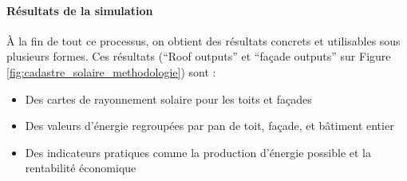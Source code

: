 \paragraph{Résultats de la simulation}
\par{À la fin de tout ce processus, on obtient des résultats concrets et utilisables sous plusieurs formes. Ces résultats (``Roof outputs'' et ``façade outputs'' sur Figure \ref{fig:cadastre_solaire_methodologie}) sont :
\begin{itemize}
    \item Des cartes de rayonnement solaire pour les toits et façades
    \item Des valeurs d'énergie regroupées par pan de toit, façade, et bâtiment entier
    \item Des indicateurs pratiques comme la production d'énergie possible et la rentabilité économique
\end{itemize}}

